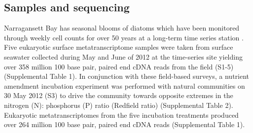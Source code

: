 \subsection{Samples and sequencing}
Narragansett Bay has seasonal blooms of diatoms which have been monitored through weekly cell counts for over 50 years at a long-term time series station \citep{Borkman2009, Li1998}. Five eukaryotic surface metatranscriptome samples were taken from surface seawater collected during May and June of 2012 at the time-series site yielding over 358 million 100 base pair, paired end cDNA reads from the field (S1-5) (Supplemental Table 1). In conjunction with these field-based surveys, a nutrient amendment incubation experiment was performed with natural communities on 30 May 2012 (S3) to drive the community towards opposite extremes in the nitrogen (N): phosphorus (P) ratio (Redfield ratio) (Supplemental Table 2). Eukaryotic metatranscriptomes from the five incubation treatments produced over 264 million 100 base pair, paired end cDNA reads (Supplemental Table 1).\par
